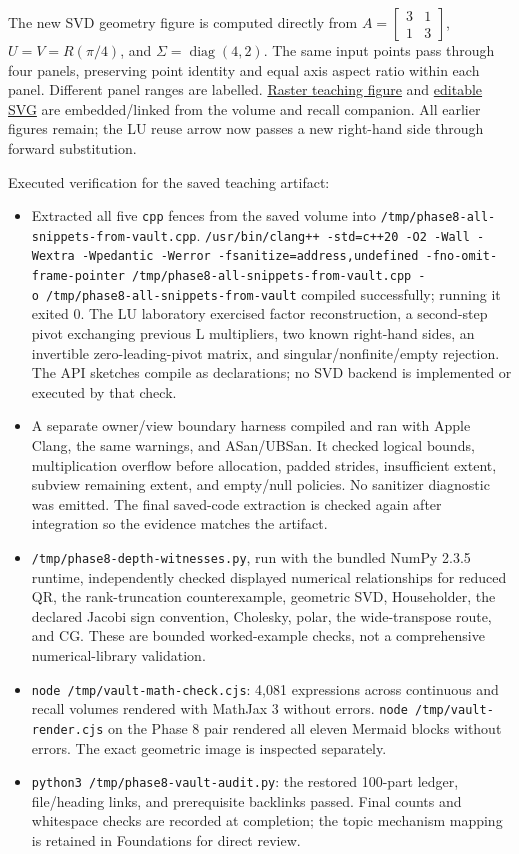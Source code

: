 The new SVD geometry figure is computed directly from \(A=\begin{bmatrix}3&1\\1&3\end{bmatrix}\), \(U=V=R(\pi/4)\), and \(\Sigma=\operatorname{diag}(4,2)\). The same input points pass through four panels, preserving point identity and equal axis aspect ratio within each panel. Different panel ranges are labelled. \href{../current/Assets/Print/b681e335dbaa5c1c27f9d47821582f982e787aff8b237276782bfc38d8631fb1.png}{Raster teaching figure} and \href{Visual\%20Recall/phase8_svd_geometry.svg}{editable SVG} are embedded/linked from the volume and recall companion. All earlier figures remain; the LU reuse arrow now passes a new right-hand side through forward substitution.

Executed verification for the saved teaching artifact:

\begin{itemize}
\tightlist
\item
  Extracted all five \texttt{cpp} fences from the saved volume into \texttt{/tmp/phase8-all-snippets-from-vault.cpp}. \texttt{/usr/bin/clang++\ -std=c++20\ -O2\ -Wall\ -Wextra\ -Wpedantic\ -Werror\ -fsanitize=address,undefined\ -fno-omit-frame-pointer\ /tmp/phase8-all-snippets-from-vault.cpp\ -o\ /tmp/phase8-all-snippets-from-vault} compiled successfully; running it exited 0. The LU laboratory exercised factor reconstruction, a second-step pivot exchanging previous L multipliers, two known right-hand sides, an invertible zero-leading-pivot matrix, and singular/nonfinite/empty rejection. The API sketches compile as declarations; no SVD backend is implemented or executed by that check.
\item
  A separate owner/view boundary harness compiled and ran with Apple Clang, the same warnings, and ASan/UBSan. It checked logical bounds, multiplication overflow before allocation, padded strides, insufficient extent, subview remaining extent, and empty/null policies. No sanitizer diagnostic was emitted. The final saved-code extraction is checked again after integration so the evidence matches the artifact.
\item
  \texttt{/tmp/phase8-depth-witnesses.py}, run with the bundled NumPy 2.3.5 runtime, independently checked displayed numerical relationships for reduced QR, the rank-truncation counterexample, geometric SVD, Householder, the declared Jacobi sign convention, Cholesky, polar, the wide-transpose route, and CG. These are bounded worked-example checks, not a comprehensive numerical-library validation.
\item
  \texttt{node\ /tmp/vault-math-check.cjs}: 4,081 expressions across continuous and recall volumes rendered with MathJax 3 without errors. \texttt{node\ /tmp/vault-render.cjs} on the Phase 8 pair rendered all eleven Mermaid blocks without errors. The exact geometric image is inspected separately.
\item
  \texttt{python3\ /tmp/phase8-vault-audit.py}: the restored 100-part ledger, file/heading links, and prerequisite backlinks passed. Final counts and whitespace checks are recorded at completion; the topic mechanism mapping is retained in Foundations for direct review.
\end{itemize}

